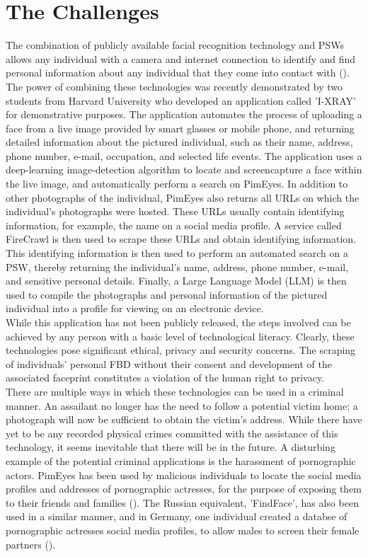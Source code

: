 \documentclass{article}
\begin{document}
\section*{\fontsize{10}{12}\selectfont The Challenges}
The combination of publicly available facial recognition technology and PSWs allows any individual with a camera and internet connection to identify and find personal information about any individual that they come into contact with (\cite{conde2024five}). The power of combining these technologies was recently demonstrated by two students from Harvard University who developed an application called 'I-XRAY' for demonstrative purposes. The application automates the process of uploading a face from a live image provided by smart glasses or mobile phone, and returning detailed information about the pictured individual, such as their name, address, phone number, e-mail, occupation, and selected life events. The application uses a deep-learning image-detection algorithm to locate and screencapture a face within the live image, and automatically perform a search on PimEyes. In addition to other photographs of the individual, PimEyes also returns all URLs on which the individual's photographs were hosted. These URLs usually contain identifying information, for example, the name on a social media profile. A service called FireCrawl is then used to scrape these URLs and obtain identifying information. This identifying information is then used to perform an automated search on a PSW, thereby returning the individual's name, address, phone number, e-mail, and sensitive personal details. Finally, a Large Language Model (LLM) is then used to compile the photographs and personal information of the pictured individual into a profile for viewing on an electronic device.
\vspace{0.3cm} \\
While this application has not been publicly released, the steps involved can be achieved by any person with a basic level of technological literacy. Clearly, these technologies pose significant ethical, privacy and security concerns. The scraping of individuals' personal FBD without their consent and development of the associated faceprint constitutes a violation of the human right to privacy.
\vspace{0.3cm} \\
There are multiple ways in which these technologies can be used in a criminal manner. An assailant no longer has the need to follow a potential victim home; a photograph will now be sufficient to obtain the victim's address. While there have yet to be any recorded physical crimes committed with the assistance of this technology, it seems inevitable that there will be in the future. A disturbing example of the potential criminal applications is the harassment of pornographic actors. PimEyes has been used by malicious individuals to locate the social media profiles and addresses of pornographic actresses, for the purpose of exposing them to their friends and families (\cite{Kiene2024}). The Russian equivalent, 'FindFace', has also been used in a similar manner, and in Germany, one individual created a databse of pornographic actresses social media profiles, to allow males to screen their female partners (\cite{SophosNews2019}).
\end{document}
